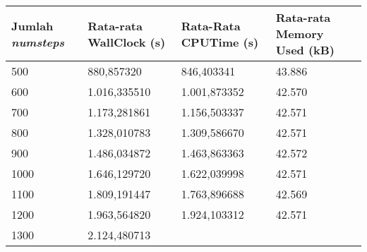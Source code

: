 \documentclass[aps,showpacs,pre,floatfix]{revtex4}
\begin{document}
\begin{table}
  \centering


\begin{tabular}{|p{65pt}|p{91pt}|p{91pt}|p{91pt}|}
\hline
\parbox{65pt}{\centering
Jumlah \textit{numsteps} } &
\parbox{91pt}{\centering Rata-rata WallClock
(s) } & \parbox{91pt}{\centering Rata-Rata CPUTime (s) } &
\parbox{91pt}{\centering Rata-rata Memory
Used (kB)
} \\
\hline
\parbox{65pt}{\centering
{\scriptsize 500}
} & \parbox{91pt}{\raggedleft
{\scriptsize 880,857320}
} & \parbox{91pt}{\raggedleft
{\scriptsize 846,403341}
} & \parbox{91pt}{\raggedleft
{\scriptsize 43.886}
} \\
\parbox{65pt}{\centering
{\scriptsize 600}
} & \parbox{91pt}{\raggedleft
{\scriptsize 1.016,335510}
} & \parbox{91pt}{\raggedleft
{\scriptsize 1.001,873352}
} & \parbox{91pt}{\raggedleft
{\scriptsize 42.570}
} \\
\parbox{65pt}{\centering
{\scriptsize 700}
} & \parbox{91pt}{\raggedleft
{\scriptsize 1.173,281861}
} & \parbox{91pt}{\raggedleft
{\scriptsize 1.156,503337}
} & \parbox{91pt}{\raggedleft
{\scriptsize 42.571}
} \\
\parbox{65pt}{\centering
{\scriptsize 800}
} & \parbox{91pt}{\raggedleft
{\scriptsize 1.328,010783}
} & \parbox{91pt}{\raggedleft
{\scriptsize 1.309,586670}
} & \parbox{91pt}{\raggedleft
{\scriptsize 42.571}
} \\
\parbox{65pt}{\centering
{\scriptsize 900}
} & \parbox{91pt}{\raggedleft
{\scriptsize 1.486,034872}
} & \parbox{91pt}{\raggedleft
{\scriptsize 1.463,863363}
} & \parbox{91pt}{\raggedleft
{\scriptsize 42.572}
} \\
\parbox{65pt}{\centering
{\scriptsize 1000}
} & \parbox{91pt}{\raggedleft
{\scriptsize 1.646,129720}
} & \parbox{91pt}{\raggedleft
{\scriptsize 1.622,039998}
} & \parbox{91pt}{\raggedleft
{\scriptsize 42.571}
} \\
\parbox{65pt}{\centering
{\scriptsize 1100}
} & \parbox{91pt}{\raggedleft
{\scriptsize 1.809,191447}
} & \parbox{91pt}{\raggedleft
{\scriptsize 1.763,896688}
} & \parbox{91pt}{\raggedleft
{\scriptsize 42.569}
} \\
\parbox{65pt}{\centering
{\scriptsize 1200}
} & \parbox{91pt}{\raggedleft
{\scriptsize 1.963,564820}
} & \parbox{91pt}{\raggedleft
{\scriptsize 1.924,103312}
} & \parbox{91pt}{\raggedleft
{\scriptsize 42.571}
} \\
\parbox{65pt}{\centering
{\scriptsize 1300}
} & \parbox{91pt}{\raggedleft
{\scriptsize 2.124,480713}
} & \parbox{91pt}{\raggedleft
}
\end{tabular}
\end{table}
\end{document}
